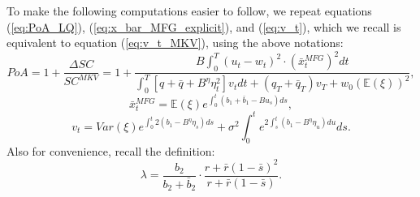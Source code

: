 \documentclass[11pt]{article}
\begin{document}
To make the following computations easier to follow, we repeat equations (\ref{eq:PoA_LQ}), (\ref{eq:x_bar_MFG_explicit}), and (\ref{eq:v_t}), which we recall is equivalent to  equation (\ref{eq:v_t_MKV}), using the above notations:
\begin{equation}
PoA =1+ \frac{\Delta SC}{SC^{MKV}}= 1 +  \frac{ \displaystyle B\int_0^T (u_t-w_t)^2 \cdot (\bar{x}_t^{MFG})^2 dt }{\displaystyle \int_0^T \left[q+\bar{q} + B^{\eta} \eta_t^2 \right] v_t dt + (q_T + \bar{q}_T) v_T + w_0 (\mathbb{E}(\xi))^2},
\label{eq:PoA_LQ_new_notation}
\end{equation}
\begin{equation}
\bar{x}^{MFG}_t=\mathbb{E}(\xi) e^{\int_0^t(b_1+\bar{b}_1-Bu_s)ds},
\label{eq:x_bar_MFG_explicit_new_notation}
\end{equation}
\begin{equation}
v_t=Var(\xi)e^{\int_0^t 2(b_1-B^{\eta} \eta_s)ds}+\sigma^2 \int_0^t e^{2 \int_s^t (b_1-B^{\eta}\eta_u) du}ds.
\label{eq:v_t_new_notation}
\end{equation}
Also for convenience, recall the definition:
\begin{equation*}
\lambda = \frac{b_2}{b_2 + \bar{b}_2}\cdot \frac{ r + \bar{r}(1-\bar{s})^2 }{r + \bar{r}(1-\bar{s})}.
\end{equation*}
\end{document}
